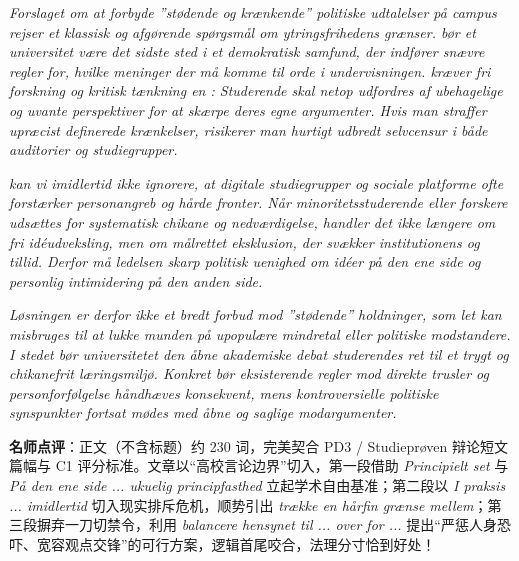 \begin{answerbox}
\textit{Forslaget om at forbyde ”stødende og krænkende” politiske udtalelser på campus rejser et klassisk og afgørende spørgsmål om ytringsfrihedens grænser.  bør et universitet være det sidste sted i et demokratisk samfund, der indfører snævre regler for, hvilke meninger der må komme til orde i undervisningen.  kræver fri forskning og kritisk tænkning en : Studerende skal netop udfordres af ubehagelige og uvante perspektiver for at skærpe deres egne argumenter. Hvis man straffer upræcist definerede krænkelser, risikerer man hurtigt udbredt selvcensur i både auditorier og studiegrupper.}

\textit{ kan vi imidlertid ikke ignorere, at digitale studiegrupper og sociale platforme ofte forstærker personangreb og hårde fronter. Når minoritetsstuderende eller forskere udsættes for systematisk chikane og nedværdigelse, handler det ikke længere om fri idéudveksling, men om målrettet eksklusion, der svækker institutionens  og tillid. Derfor må ledelsen  skarp politisk uenighed om idéer på den ene side og personlig intimidering på den anden side.}

\textit{Løsningen er derfor ikke et bredt forbud mod ”stødende” holdninger, som let kan misbruges til at lukke munden på upopulære mindretal eller politiske modstandere. I stedet bør universitetet  den åbne akademiske debat  studerendes ret til et trygt og chikanefrit læringsmiljø. Konkret bør eksisterende regler mod direkte trusler og personforfølgelse håndhæves konsekvent, mens kontroversielle politiske synspunkter fortsat mødes med åbne og saglige modargumenter.}

\small\textbf{名师点评}：正文（不含标题）约 230 词，完美契合 PD3 / Studieprøven 辩论短文篇幅与 C1 评分标准。文章以“高校言论边界”切入，第一段借助 \textit{Principielt set} 与 \textit{På den ene side ... ukuelig principfasthed} 立起学术自由基准；第二段以 \textit{I praksis ... imidlertid} 切入现实排斥危机，顺势引出 \textit{trække en hårfin grænse mellem}；第三段摒弃一刀切禁令，利用 \textit{balancere hensynet til ... over for ...} 提出“严惩人身恐吓、宽容观点交锋”的可行方案，逻辑首尾咬合，法理分寸恰到好处！
\end{answerbox}
